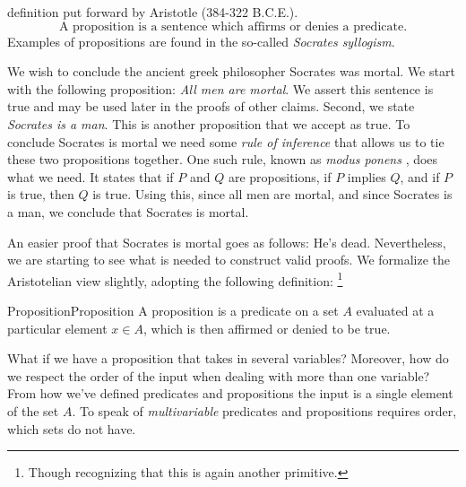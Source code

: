         definition put forward by Aristotle (384-322 B.C.E.).
        \begin{equation}
            \text{A proposition is a sentence which affirms or denies a }
            \text{predicate.}
        \end{equation}
        Examples of propositions are found in the so-called
        \textit{Socrates syllogism}.
        \begin{example}
            We wish to conclude the ancient greek philosopher
            Socrates was mortal. We start with the following
            proposition: \textit{All men are mortal}. We assert this sentence is
            true and may be used later in the proofs of other claims. Second,
            we state \textit{Socrates is a man}. This is another proposition
            that we accept as true. To conclude Socrates is mortal we need some
            \textit{rule of inference} that allows us to tie these two
            propositions together. One such rule, known as
            \textit{modus ponens}%
            , does what we need. It states
            that if $P$ and $Q$ are propositions, if $P$ implies $Q$, and if $P$
            is true, then $Q$ is true. Using this, since all men are mortal, and
            since Socrates is a man, we conclude that Socrates is mortal.
        \end{example}
        An easier proof that Socrates is mortal goes as follows: He's dead.
        Nevertheless, we are starting to see what is needed to construct valid
        proofs. We formalize the Aristotelian view slightly, adopting the
        following definition:%
        \footnote{%
            Though recognizing that this is again another primitive.
        }
        \begin{fdefinition}{Proposition}{Proposition}
            A \gls{proposition} is a \gls{predicate} on a \gls{set} $A$
            evaluated at a particular element $x\in{A}$, which is then affirmed
            or denied to be true.%
        \end{fdefinition}
        What if we have a proposition that takes in several variables? Moreover,
        how do we respect the order of the input when dealing with more than one
        variable? From how we've defined predicates and propositions the input
        is a single element of the set $A$. To speak of \textit{multivariable}
        predicates and propositions requires order, which sets do not have.
